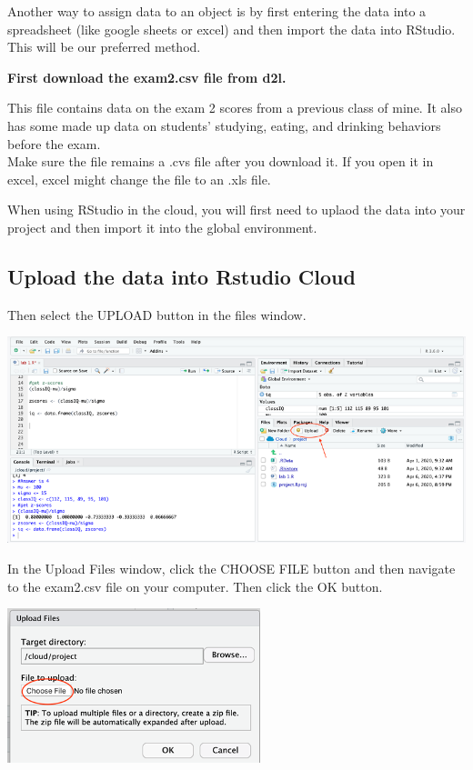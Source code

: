 \documentclass[
]{book}
\begin{document}
Another way to assign data to an object is by first entering the data into a spreadsheet (like google sheets or excel) and then import the data into RStudio. This will be our preferred method.

\textbf{First download the exam2.csv file from d2l.}

This file contains data on the exam 2 scores from a previous class of mine. It also has some made up data on students' studying, eating, and drinking behaviors before the exam.\\
Make sure the file remains a .cvs file after you download it. If you open it in excel, excel might change the file to an .xls file.

When using RStudio in the cloud, you will first need to uplaod the data into your project and then import it into the global environment.

\hypertarget{upload-the-data-into-rstudio-cloud}{%
\subsection{Upload the data into Rstudio Cloud}\label{upload-the-data-into-rstudio-cloud}}

Then select the UPLOAD button in the files window.

\includegraphics{img/upload.png}

In the Upload Files window, click the CHOOSE FILE button and then navigate to the exam2.csv file on your computer. Then click the OK button.

\includegraphics{img/choosefile.png}
\end{document}
